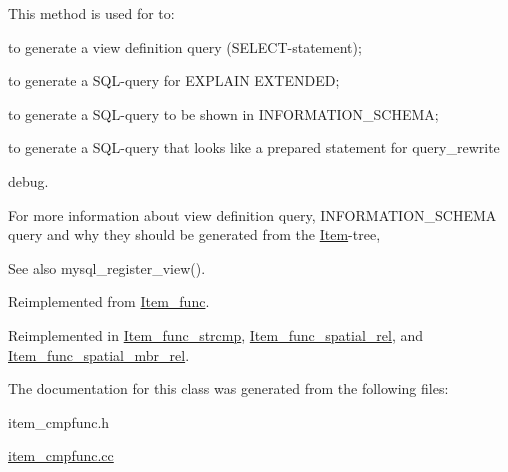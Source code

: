 This method is used for to\+:
\begin{DoxyItemize}
\item to generate a view definition query (S\+E\+L\+E\+CT-\/statement);
\item to generate a S\+QL-\/query for E\+X\+P\+L\+A\+IN E\+X\+T\+E\+N\+D\+ED;
\item to generate a S\+QL-\/query to be shown in I\+N\+F\+O\+R\+M\+A\+T\+I\+O\+N\+\_\+\+S\+C\+H\+E\+MA;
\item to generate a S\+QL-\/query that looks like a prepared statement for query\+\_\+rewrite
\item debug.
\end{DoxyItemize}

For more information about view definition query, I\+N\+F\+O\+R\+M\+A\+T\+I\+O\+N\+\_\+\+S\+C\+H\+E\+MA query and why they should be generated from the \mbox{\hyperlink{classItem}{Item}}-\/tree, \begin{DoxySeeAlso}{See also}
mysql\+\_\+register\+\_\+view(). 
\end{DoxySeeAlso}


Reimplemented from \mbox{\hyperlink{classItem__func_afb302ee25d4721ace27d3f5053d4ee41}{Item\+\_\+func}}.



Reimplemented in \mbox{\hyperlink{classItem__func__strcmp_a524a65bbd7fcff131c5ba9547cfe79e4}{Item\+\_\+func\+\_\+strcmp}}, \mbox{\hyperlink{classItem__func__spatial__rel_aa0e96f4e0cebc9ea671b253d885f4ab9}{Item\+\_\+func\+\_\+spatial\+\_\+rel}}, and \mbox{\hyperlink{classItem__func__spatial__mbr__rel_a0f37964f2e40c8cf415dd81f03795c35}{Item\+\_\+func\+\_\+spatial\+\_\+mbr\+\_\+rel}}.



The documentation for this class was generated from the following files\+:\begin{DoxyCompactItemize}
\item 
item\+\_\+cmpfunc.\+h\item 
\mbox{\hyperlink{item__cmpfunc_8cc}{item\+\_\+cmpfunc.\+cc}}\end{DoxyCompactItemize}
